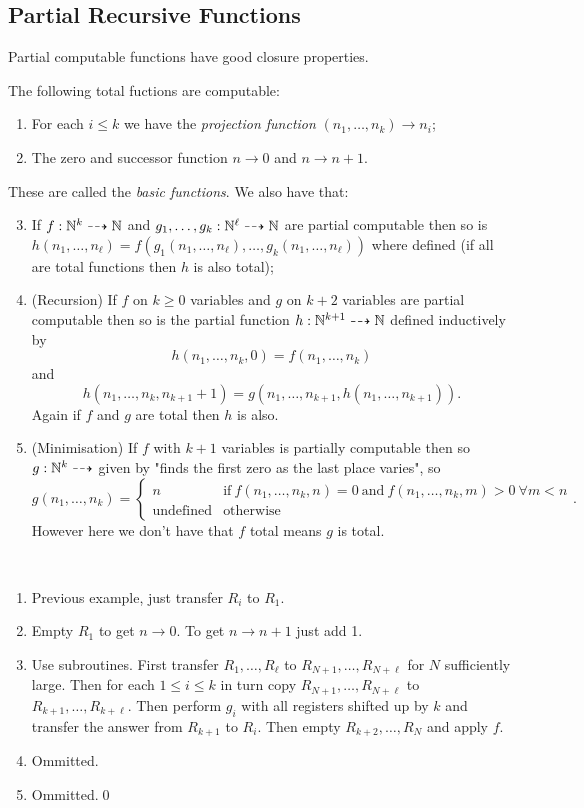 \documentclass[tikx, border = 10pt]{article}
\begin{document}
\subsection{Partial Recursive Functions}
Partial computable functions have good closure properties.
\begin{theorem}
	The following total fuctions are computable:
	\begin{enumerate}
		\item For each $ i\le k $ we have the \textit{projection function} $ (n_1,\dots, n_k) \to n_i $;
		\item The zero and successor function $ n \to 0 $ and $ n \to n + 1 $.
	\end{enumerate}
	These are called the \textit{basic functions}. We also have that:
	\begin{enumerate}
		\setcounter{enumi}{2}
		\item If $ f: \mathbb{N}^k \dashrightarrow \mathbb{N} $ and $ g_1,\dots, g_k : \mathbb{N}^\ell \dashrightarrow \mathbb{N} $ are partial computable then so is $ h(n_1,\dots, n_\ell) = f(g_1(n_1,\dots, n_\ell),\dots, g_k(n_1,\dots, n_\ell)) $ where defined (if all are total functions then $ h $ is also total);
		\item (Recursion) If $ f $ on $ k\ge 0 $ variables and $ g $ on $ k+2 $ variables are partial computable then so is the partial function $ h: \mathbb{N}^{k+1} \dashrightarrow \mathbb{N} $ defined inductively by
			\[
			  h(n_1,\dots, n_k, 0) = f(n_1,\dots,n_k) 
			\]
			and
			\[
				h(n_1,\dots, n_k,n_{k+1} +1) = g(n_1,\dots, n_{k+1}, h(n_1,\dots, n_{k+1})).
			\]
			Again if $ f $ and $ g $ are total then $ h $ is also.
		\item (Minimisation) If $ f $ with $ k+1 $ variables is partially computable then so $ g: \mathbb{N}^k \dashrightarrow $ given by "finds the first zero as the last place varies", so
			\[
			  g(n_1,\dots, n_k) = \begin{cases}
				  n & \text{if}\ f(n_1,\dots, n_k,n) = 0 \ \text{and}\ f(n_1,\dots, n_k,m) > 0 \ \forall m < n \\
				  \text{undefined} & \text{otherwise}
			  \end{cases}.
			\]
			However here we don't have that $ f $ total means $ g $ is total.
	\end{enumerate}
\end{theorem}
\pf  \ 
\begin{enumerate}
	\item Previous example, just transfer $ R_i $ to $ R_1 $.
	\item Empty $ R_1 $ to get $ n\to 0 $. To get $ n\to n+1 $ just add 1.
	\item Use subroutines. First transfer $ R_1, \dots, R_\ell $ to $ R_{N+1},\dots, R_{N+\ell} $ for $ N $ sufficiently large. Then for each $ 1 \le i \le k $ in turn copy $ R_{N+1}, \dots, R_{N+\ell} $ to $ R_{k+1},\dots, R_{k+\ell} $. Then perform $ g_i $ with all registers shifted up by $ k $ and transfer the answer from $ R_{k+1} $ to $ R_i $. Then empty $ R_{k+2},\dots, R_N $ and apply $ f $.
	\item Ommitted.
	\item Ommitted.\qed
\end{enumerate}
\end{document}
